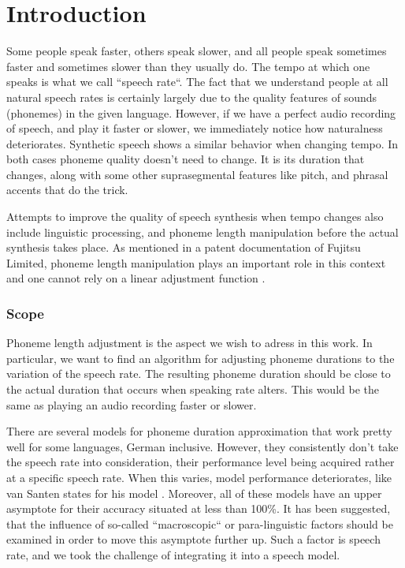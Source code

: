 \documentclass[11pt,a4paper]{scrbook}
\begin{document}
\tableofcontents\thispagestyle{empty}

\mainmatter

\chapter{Introduction}
Some people speak faster, others speak slower, and all people speak sometimes faster and sometimes slower than they usually do. The tempo at which one speaks is what we call ``speech rate``. The fact that we understand people at all natural speech rates is certainly largely due to the quality features of sounds (phonemes) in the given language. However, if we have a perfect audio recording of speech, and play it faster or slower, we immediately notice how naturalness deteriorates. Synthetic speech shows a similar behavior when changing tempo. In both cases phoneme quality doesn't need to change. It is its duration that changes, along with some other suprasegmental features like pitch, and phrasal accents that do the trick. 

Attempts to improve the quality of speech synthesis when tempo changes also include linguistic processing, and phoneme length manipulation before the actual synthesis takes place. As mentioned in a patent documentation of Fujitsu Limited, phoneme length manipulation plays an important role in this context and one cannot rely on a linear adjustment function \cite{nishiike2008}. 

\subsection*{Scope}
Phoneme length adjustment is the aspect we wish to adress in this work. In particular, we want to find an algorithm for adjusting phoneme durations to the variation of the speech rate. The resulting phoneme duration should be close to the actual duration that occurs when speaking rate alters. This would be the same as playing an audio recording faster or slower. 

There are several models for phoneme duration approximation that work pretty well for some languages, German inclusive. However, they consistently don't take the speech rate into consideration, their performance level being acquired rather at a specific speech rate. When this varies, model performance deteriorates, like van Santen states for his model \cite{Santen1994}. Moreover, all of these models have an upper asymptote for their accuracy situated at less than 100\%. It has been suggested, that the influence of so-called ``macroscopic`` or para-linguistic \cite{Santen1994} factors should be examined in order to move this asymptote further up. Such a factor is speech rate, and we took the challenge of integrating it into a speech model. 
\end{document}

